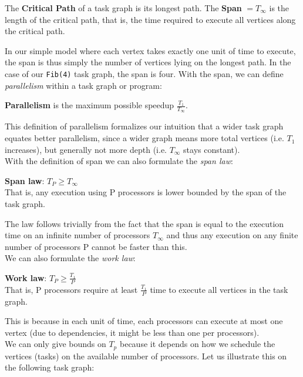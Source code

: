 \documentclass[main.tex]{subfiles}
\begin{document}
\begin{definition}
  The \textbf{Critical Path} of a task graph is its longest path. The \textbf{Span} \(=T_{\infty}\) is the length of the critical path, that is, the time required to execute all vertices along the critical path.
\end{definition}

\noindent In our simple model where each vertex takes exactly one unit of time to execute, the span is thus simply the number of vertices lying on the longest path. In the case of our \texttt{Fib(4)} task graph, the span is four. With the span, we can define \textit{parallelism} within a task graph or program:

\begin{definition}
  \textbf{Parallelism} is the maximum possible speedup \(\frac{T_{1}}{T_{\infty}}\).
\end{definition}

\noindent This definition of parallelism formalizes our intuition that a wider task graph equates better parallelism, since a wider graph means more total vertices (i.e. \(T_{1}\) increases), but generally not more depth (i.e. \(T_{\infty}\) stays constant).\\[3mm]
With the definition of span we can also formulate the \textit{span law}:

\begin{theorem}
  \textbf{Span law}: \(T_{P}\geq T_{\infty}\)\\
  That is, any execution using P processors is lower bounded by the span of the task graph.
\end{theorem}

\noindent The law follows trivially from the fact that the span is equal to the execution time on an infinite number of processors \(T_{\infty}\) and thus any execution on any finite number of processors P cannot be faster than this.\\[3mm]
We can also formulate the \textit{work law}:

\begin{theorem}
  \textbf{Work law}: \(T_{P}\geq \frac{T_{1}}{P}\)\\
  That is, P processors require at least \(\frac{T_{1}}{P}\) time to execute all vertices in the task graph.
\end{theorem}

\noindent This is because in each unit of time, each processors can execute at most one vertex (due to dependencies, it might be less than one per processors).\\
We can only give bounds on \(T_{p}\) because it depends on how we schedule the vertices (tasks) on the available number of processors. Let us illustrate this on the following task graph:
\end{document}
